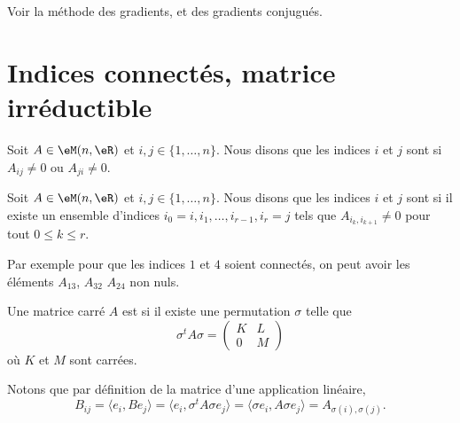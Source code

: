 Voir la méthode des gradients, et des gradients conjugués.

\section{Indices connectés, matrice irréductible}

\begin{definition}
    Soit \( A\in \eM(n,\eR)\) et \( i,j\in\{ 1,\ldots, n \}\). Nous disons que les indices \( i\) et \( j\) sont  si \( A_{ij}\neq 0\) ou \( A_{ji}\neq 0\).
\end{definition}

\begin{definition}      \label{DEFooADAAooAAMscc}
    Soit \( A\in \eM(n,\eR)\) et \( i,j\in\{ 1,\ldots, n \}\). Nous disons que les indices \( i\) et \( j\) sont  si il existe un ensemble d'indices \( i_0=i,i_1,\ldots, i_{r-1},i_r=j   \) tels que \( A_{i_k,i_{k+1}}\neq 0\) pour tout \( 0\leq k\leq r\).
\end{definition}

Par exemple pour que les indices \( 1\) et \( 4\) soient connectés, on peut avoir les éléments \( A_{13}\), \( A_{32}\) \( A_{24}\) non nuls.

\begin{definition}      \label{DEFooXIREooQtlzkO}
    Une matrice carré \( A\) est  si il existe une permutation \( \sigma\) telle que 
    \begin{equation}        \label{EQooGGZKooUyXSJk}
        \sigma^tA\sigma=\begin{pmatrix}
            K    &   L    \\ 
            0    &   M    
        \end{pmatrix}
    \end{equation}
    où \( K\) et \( M\) sont carrées.
\end{definition}
Notons que par définition de la matrice d'une application linéaire,
\begin{equation}
    B_{ij}= \langle e_i, Be_j\rangle =\langle e_i, \sigma^tA\sigma e_j\rangle =\langle \sigma e_i, A\sigma e_j\rangle =A_{\sigma(i),\sigma(j)}.
\end{equation}

